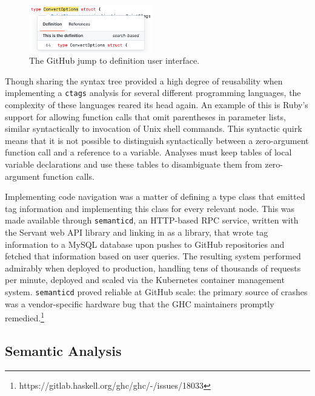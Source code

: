 \documentclass[acmsmall,fleqn]{acmart}
\begin{document}
\begin{figure}
  \begin{center}
    \includegraphics[width=0.48\textwidth]{code-nav-screenshot.png}
  \end{center}
  \caption{The GitHub jump to definition user interface.}
  \label{fig:CodeNavScreenshot}
\end{figure}

Though sharing the syntax tree provided a high degree of reusability when
implementing a \texttt{ctags} analysis for several different programming
languages, the complexity of these languages reared its head again. An example
of this is Ruby’s support for allowing function calls that omit parentheses in
parameter lists, similar syntactically to invocation of Unix shell commands.
This syntactic quirk means that it is not possible to distinguish syntactically
between a zero-argument function call and a reference to a variable. Analyses
must keep tables of local variable declarations and use these tables to
disambiguate them from zero-argument function calls.

Implementing code navigation was a matter of defining a type class that emitted
tag information and implementing this class for every relevant node. This was
made available through \texttt{semanticd}, an HTTP-based RPC service, written
with the Servant web API library \cite{servant14} and linking in \semantic{} as
a library, that wrote tag information to a MySQL database upon pushes to GitHub
repositories and fetched that information based on user queries. The resulting
system performed admirably when deployed to production, handling tens of
thousands of requests per minute, deployed and scaled via the Kubernetes
\cite{google14kube} container management system. \texttt{semanticd} proved
reliable at GitHub scale: the primary source of crashes was a vendor-specific
hardware bug that the GHC maintainers promptly
remedied.\footnote{https://gitlab.haskell.org/ghc/ghc/-/issues/18033}

\subsection{Semantic Analysis}
\end{document}
